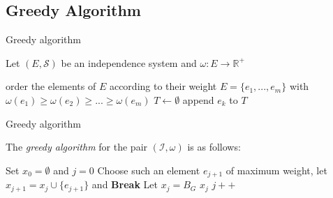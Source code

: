 \documentclass[../main.tex]{subfiles}
\begin{document}
\subsection{Greedy Algorithm}
\begin{algorithm}[H]
\caption{Greedy algorithm}\label{greedy}
Let $(E,\mathcal{S})$ be an independence system and $\omega:E \longrightarrow \mathbb{R^+}$
\begin{algorithmic}[1]
\State order the elements of $E$ according to their weight
\State $E = \{ e_1,...,e_m\}$ with $\omega(e_1) \geq \omega(e_2) \geq ... \geq \omega(e_m)$
\State $T\gets \emptyset$
	 	\State append $e_k$ to $T$
	\EndIf
\EndFor
\EndProcedure
\end{algorithmic}
\end{algorithm}

\begin{algorithm}[H]
\caption{Greedy algorithm}\label{matroid_ver}
The \textit{greedy algorithm} for the pair $(\mathcal{I}, \omega)$ is as follows:
\begin{algorithmic}[1]
\State Set $x_0 = \emptyset$ and $j=0$
\State Choose such an element $e_{j+1}$ of maximum weight,
\State let $x_{j+1} = x_j \cup \{e_{j+1}\}$ and \textbf{Break}
\Else 
\State Let $x_j = B_G$
\State\Return $x_j$
\EndIf
\State $j++$

\EndProcedure
\end{algorithmic}
\end{algorithm}
\end{document}
